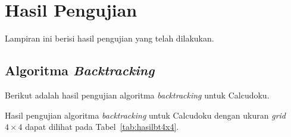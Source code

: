 \chapter{Hasil Pengujian}
\label{chap:hasilpengujian}

Lampiran ini berisi hasil pengujian yang telah dilakukan.

\section{Algoritma \textit{Backtracking}}
\label{sec:hasilbt}

Berikut adalah hasil pengujian algoritma \textit{backtracking} untuk Calcudoku.

Hasil pengujian algoritma \textit{backtracking} untuk Calcudoku dengan ukuran \textit{grid} \begin{math}4 \times 4\end{math} dapat dilihat pada Tabel~\ref{tab:hasilbt4x4}.

